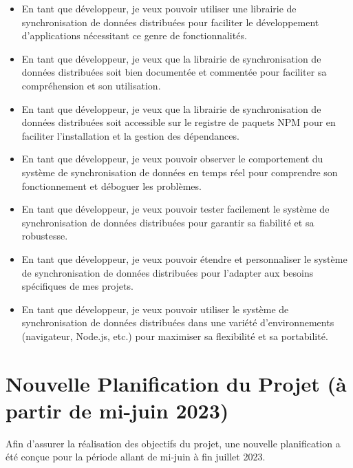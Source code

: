 \begin{itemize}
    \item En tant que développeur, je veux pouvoir utiliser une librairie de synchronisation de données distribuées pour faciliter le développement d'applications nécessitant ce genre de fonctionnalités.
    \item En tant que développeur, je veux que la librairie de synchronisation de données distribuées soit bien documentée et commentée pour faciliter sa compréhension et son utilisation.
    \item En tant que développeur, je veux que la librairie de synchronisation de données distribuées soit accessible sur le registre de paquets NPM pour en faciliter l'installation et la gestion des dépendances.
    \item En tant que développeur, je veux pouvoir observer le comportement du système de synchronisation de données en temps réel pour comprendre son fonctionnement et déboguer les problèmes.
    \item En tant que développeur, je veux pouvoir tester facilement le système de synchronisation de données distribuées pour garantir sa fiabilité et sa robustesse.
    \item En tant que développeur, je veux pouvoir étendre et personnaliser le système de synchronisation de données distribuées pour l'adapter aux besoins spécifiques de mes projets.
    \item En tant que développeur, je veux pouvoir utiliser le système de synchronisation de données distribuées dans une variété d'environnements (navigateur, Node.js, etc.) pour maximiser sa flexibilité et sa portabilité.
\end{itemize}

\section*{Nouvelle Planification du Projet (à partir de mi-juin 2023)}

Afin d'assurer la réalisation des objectifs du projet, une nouvelle
planification a été conçue pour la période allant de mi-juin à fin juillet 2023.

